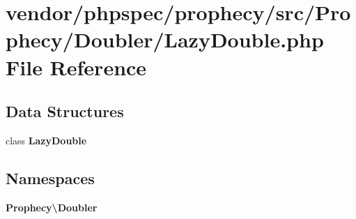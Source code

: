 \section{vendor/phpspec/prophecy/src/\+Prophecy/\+Doubler/\+Lazy\+Double.php File Reference}
\label{_lazy_double_8php}
\subsection*{Data Structures}
\begin{DoxyCompactItemize}
\item 
class {\bf Lazy\+Double}
\end{DoxyCompactItemize}
\subsection*{Namespaces}
\begin{DoxyCompactItemize}
\item 
 {\bf Prophecy\textbackslash{}\+Doubler}
\end{DoxyCompactItemize}
